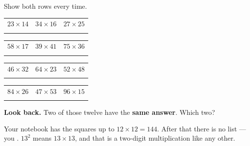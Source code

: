 \documentclass[12pt,a4paper]{article}
\begin{document}

\noindent {} Show both rows every time.

\vspace{4pt}
\noindent
\begin{tabularx}{\textwidth}{|X|X|X|}
  \hline
  $23 \times 14$ & $34 \times 16$ & $27 \times 25$ \\
  \rule[-3.5em]{0pt}{4.3em} & & \\
  \hline
\end{tabularx}

\vspace{9pt}
\noindent
\begin{tabularx}{\textwidth}{|X|X|X|}
  \hline
  $58 \times 17$ & $39 \times 41$ & $75 \times 36$ \\
  \rule[-3.5em]{0pt}{4.3em} & & \\
  \hline
\end{tabularx}

\vspace{9pt}
\noindent
\begin{tabularx}{\textwidth}{|X|X|X|}
  \hline
  $46 \times 32$ & $64 \times 23$ & $52 \times 48$ \\
  \rule[-3.5em]{0pt}{4.3em} & & \\
  \hline
\end{tabularx}

\vspace{9pt}
\noindent
\begin{tabularx}{\textwidth}{|X|X|X|}
  \hline
  $84 \times 26$ & $47 \times 53$ & $96 \times 15$ \\
  \rule[-3.5em]{0pt}{4.3em} & & \\
  \hline
\end{tabularx}

\vspace{10pt}
\noindent\textbf{Look back.} Two of those twelve have the \textbf{same answer}.
Which two? \blank[4.4cm]


\begin{remember}
  Your notebook has the squares up to $12 \times 12 = 144$. After that there is no
  list --- you . $13^2$ means $13 \times 13$, and that is a
  two-digit multiplication like any other.
\end{remember}
\end{document}
